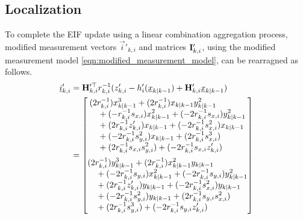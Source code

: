 \documentclass[10pt,letterpaper,oneside,twocolumn,journal]{IEEEtran}
\theoremstyle{definition}
\theoremstyle{definition}
\theoremstyle{remark}
\begin{document}
\subsection{Localization} \label{subsec:localization}
To complete the EIF update using a linear combination aggregation process, modified measurement vectors $\vec{i}'_{k,i}$ and matrices ${{\mathbf{I}}}'_{k,i}$, using the modified measurement model \eqref{eqn:modified_measurement_model}, can be rearragned as follows.
\begin{equation}
    \begin{split}
        \vec{i}'_{k,i} &= \mat{H}_{k,i}^{\prime\top} r_{k,i}^{-1}(z'_{k,i} - h'_i(\vec{x}_{k|k-1}) + \mat{H}'_{k,i}\vec{x}_{k|k-1}) \\
        &= 
        \begin{bmatrix}
            \begin{split}
                &(2r_{k,i}^{-1})x_{k|k-1}^3 + (2r_{k,i}^{-1})x_{k|k-1}y_{k|k-1}^2 \\
                &\quad+ (-r_{k,i}^{-1}s_{x,i})x_{k|k-1}^2 + (-2r_{k,i}^{-1}s_{x,i})y_{k|k-1}^2 \\
                &\quad+ (2r_{k,i}^{-1}z'_{k,i})x_{k|k-1} + (-2r_{k,i}^{-1}s_{x,i}^2)x_{k|k-1}\\
                &\quad+ (-2r_{k,i}^{-1}s_{y,i}^2)x_{k|k-1} + (2r_{k,i}^{-1}s_{x,i}^3) \\
                &\quad+ (2r_{k,i}^{-1}s_{x,i}s_{y,i}^2) + (-2r_{k,i}^{-1}s_{x,i} z'_{k,i})
            \end{split}
            \vspace{5pt}\\
            \begin{split}
                &(2r_{k,i}^{-1})y_{k|k-1}^3 + (2r_{k,i}^{-1})x_{k|k-1}^2y_{k|k-1} \\
                &\quad+ (-2r_{k,i}^{-1}s_{y,i})x_{k|k-1}^2 + (-2r_{k,i}^{-1}s_{y,i})y_{k|k-1}^2 \\
                &\quad+ (2r_{k,i}^{-1}z'_{k,i})y_{k|k-1} + (-2r_{k,i}^{-1}s_{x,i}^2)y_{k|k-1} \\
                &\quad+ (-2r_{k,i}^{-1}s_{y,i}^2)y_{k|k-1} + (2r_{k,i}^{-1}s_{y,i}s_{x,i}^2) \\
                &\quad+ (2r_{k,i}^{-1}s_{y,i}^3) + (-2r_{k,i}^{-1}s_{y,i}z'_{k,i})
            \end{split}
        \end{bmatrix}
    \end{split} \label{eqn:hrz_linear_comb}
\end{equation}
\end{document}
